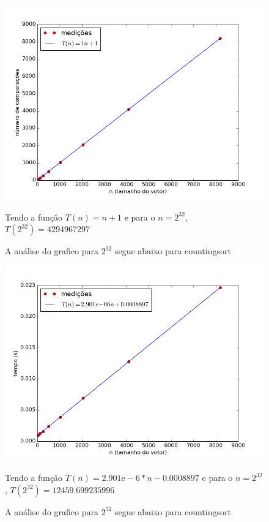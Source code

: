 \documentclass[12pt,a4paper,twoside]{report}
\begin{document}
\begin{figure}[ht]
\centering \includegraphics[scale=0.8]{../countingsort/imagens/countingsortQuaseDecresc101.png}
\caption{A análise do grafico para $2^{32}$ segue abaixo para countingsort}

Tendo a função $T(n) = n+1$ e para o $n =2^{32}$, $T(2^{32}) = 4294967297$ 
\label{fig:countingsortQuaseDecresc101}
\end{figure}




\begin{figure}[ht]
\centering \includegraphics[scale=0.8]{../countingsort/imagens/countingsortQuaseDecresc200.png}
\caption{A análise do grafico para $2^{32}$ segue abaixo para countingsort}

Tendo a função $T(n) = 2.901\mathrm{e}-6*n-0.0008897$ e para o $n =2^{32}$, $T(2^{32}) = 12459.699235996$ 
\label{fig:countingsortQuaseDecresc200}
\end{figure}
\end{document}
